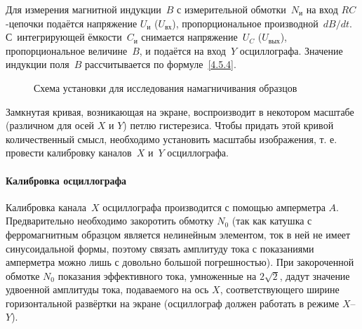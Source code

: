 Для измерения магнитной индукции~$B$ с измерительной обмотки~$N_{и}$ на
вход $RC$-цепочки подаётся напряжение $U_{и}$ ($U_{вх}$),
пропорциональное производной~$dB/dt$.
С~интегрирующей ёмкости~$C_{и}$ снимается напряжение~$U_C$ ($U_{вых}$),
пропорциональное величине~$B$, и подаётся на вход~$Y$ осциллографа.
Значение индукции поля~$B$ рассчитывается по формуле~\eqref{4.5.4}.

\begin{figure}[h!]
\centering
	\caption{Схема установки для исследования намагничивания образцов}
\end{figure}

Замкнутая кривая, возникающая на экране, воспроизводит в некотором масштабе
(различном для осей $X$ и $Y$) петлю гистерезиса. Чтобы придать этой кривой
количественный смысл, необходимо установить масштабы изображения, т. е. провести
калибровку каналов~$X$ и~$Y$ осциллографа.
%





\paragraph{Калибровка осциллографа}
Калибровка канала~$X$ осциллографа производится с помощью амперметра $A$.
Предварительно необходимо закоротить обмотку $N_0$
(так как катушка с ферромагнитным образцом является
нелинейным элементом, ток в ней не имеет синусоидальной формы,
поэтому связать амплитуду тока с показаниями амперметра можно лишь
с довольно большой погрешностью). При закороченной обмотке $N_0$
показания эффективного тока, умноженные на $2\sqrt{2}$,
дадут значение удвоенной амплитуды тока, подаваемого на ось $X$,
соответствующего ширине горизонтальной развёртки на экране
(осциллограф должен работать в режиме $X$--$Y$).

